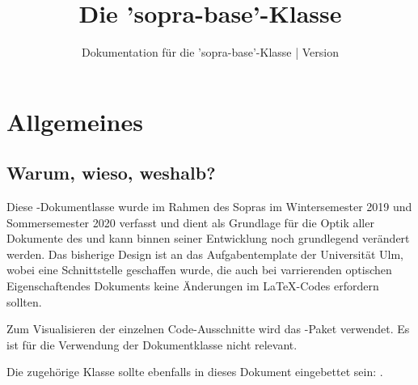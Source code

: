 \documentclass{sopra-base}
\title{Die 'sopra-base'-Klasse}
\subtitle[Dokumentation für die 'sopra-base'-Klasse]{Dokumentation für die 'sopra-base'-Klasse | Version \thesobversion}
\begin{document}
    \maketitle%
%
%

%
%
%
%

\section{Allgemeines}
\subsection{Warum, wieso, weshalb?}
    Diese \LaTeXe-Dokumentlasse wurde im Rahmen des Sopras im
    Wintersemester 2019 und Sommersemester 2020 verfasst und dient als
    Grundlage für die Optik aller Dokumente des  und kann
    binnen seiner Entwicklung noch grundlegend verändert werden. Das
    bisherige Design ist an das Aufgabentemplate der Universität Ulm, wobei
    eine Schnittstelle geschaffen wurde, die auch bei varrierenden optischen
    Eigenschaftendes Dokuments keine Änderungen im \LaTeX-Codes erfordern
    sollten.\par
    Zum Visualisieren der einzelnen Code-Ausschnitte wird das
    -Paket verwendet. Es ist für die Verwendung der Dokumentklasse
    nicht relevant.\par
    Die zugehörige Klasse sollte ebenfalls in dieses Dokument eingebettet sein: .
\end{document}
